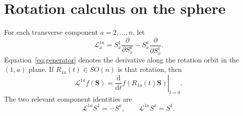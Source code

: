 \documentclass[aps,prb,twocolumn,groupedaddress,amsmath,amssymb,
               superscriptaddress,nofootinbib,floatfix]{revtex4-2}
\theoremstyle{plain}
\theoremstyle{definition}
\newcommand{\dd}{\mathrm{d}}
\begin{document}
\begin{table}[t]
\caption{\label{tab:scope}
Hypotheses used by Theorem~\ref{thm:main}.  The right column lists changes
that require a new argument rather than a change of notation.}
\centering
\renewcommand{\arraystretch}{1.18}
\end{table}

\section{Rotation calculus on the sphere}
\label{sec:rotation}

For each transverse component $a=2,\ldots,n$, let
\begin{equation}
 \mathcal L_x^{1a}
 =
 S_x^1\frac{\partial}{\partial S_x^a}
 -
 S_x^a\frac{\partial}{\partial S_x^1}.                 \label{eq:generator}
\end{equation}
Equation~\eqref{eq:generator} denotes the derivative along the rotation
orbit in the $(1,a)$ plane.  If $R_{1a}(t)\in SO(n)$ is that rotation, then
\begin{equation}
 \mathcal L^{1a}f(\bm S)
 =
 \left.\frac{\dd}{\dd t}f(R_{1a}(t)\bm S)\right|_{t=0}. \label{eq:orbit-derivative}
\end{equation}
The two relevant component identities are
\begin{equation}
 \mathcal L^{1a}S^1=-S^a,\qquad
 \mathcal L^{1a}S^a=S^1.                               \label{eq:component-rotation}
\end{equation}
\end{document}
